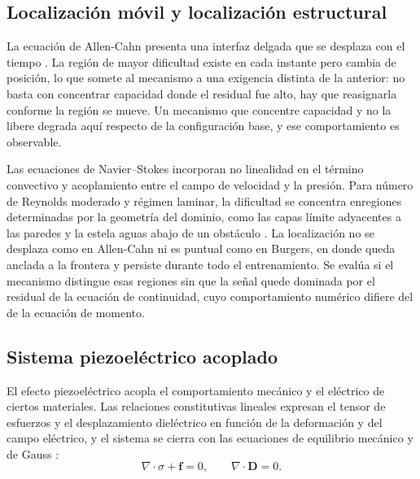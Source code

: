 \subsection{Localización móvil y localización estructural}

La ecuación de Allen-Cahn presenta una interfaz delgada que se desplaza
con el tiempo \cite{raissi2019}. La región de mayor dificultad existe
en cada instante pero cambia de posición, lo que somete al mecanismo a
una exigencia distinta de la anterior: no basta con concentrar capacidad
donde el residual fue alto, hay que reasignarla conforme la región se
mueve. Un mecanismo que concentre capacidad y no la libere degrada aquí
respecto de la configuración base, y ese comportamiento es observable.

Las ecuaciones de Navier--Stokes incorporan no linealidad en el término convectivo y acoplamiento entre el campo de velocidad y la presión. Para número de Reynolds moderado y régimen laminar, la dificultad se concentra enregiones determinadas por la geometría del dominio, como las capas límite
adyacentes a las paredes y la estela aguas abajo de un obstáculo
\cite{raissi2019,jin2021nsfnets}. La localización no se desplaza como en
Allen-Cahn ni es puntual como en Burgers, en donde  queda anclada a la frontera y
persiste durante todo el entrenamiento. Se evalúa si el mecanismo
distingue esas regiones sin que la señal quede dominada por el residual de
la ecuación de continuidad, cuyo comportamiento numérico difiere del de
la ecuación de momento.



\subsection{Sistema piezoeléctrico acoplado}

El efecto piezoeléctrico acopla el comportamiento mecánico y el eléctrico
de ciertos materiales. Las relaciones constitutivas lineales expresan el
tensor de esfuerzos y el desplazamiento dieléctrico en función de la
deformación y del campo eléctrico, y el sistema se cierra con las
ecuaciones de equilibrio mecánico y de Gauss
\cite{gonzalez2026pinnpiezo,lahmer2008}:
\begin{equation}
\nabla \cdot \sigma + \bm{f} = 0,
\qquad
\nabla \cdot \bm{D} = 0 .
\label{eq:piezo}
\end{equation}

